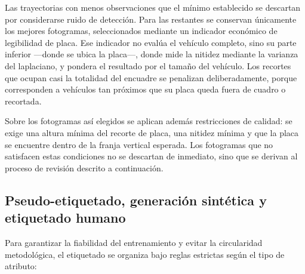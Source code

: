 Las trayectorias con menos observaciones que el mínimo establecido se descartan
por considerarse ruido de detección. Para las restantes se conservan únicamente
los mejores fotogramas, seleccionados mediante un indicador económico de
legibilidad de placa. Ese indicador no evalúa el vehículo completo, sino su parte
inferior ---donde se ubica la placa---, donde mide la nitidez mediante la varianza
del laplaciano, y pondera el resultado por el tamaño del vehículo. Los recortes
que ocupan casi la totalidad del encuadre se penalizan deliberadamente, porque
corresponden a vehículos tan próximos que su placa queda fuera de cuadro o
recortada.

Sobre los fotogramas así elegidos se aplican además restricciones de calidad: se
exige una altura mínima del recorte de placa, una nitidez mínima y que la placa se
encuentre dentro de la franja vertical esperada. Los fotogramas que no satisfacen
estas condiciones no se descartan de inmediato, sino que se derivan al proceso de
revisión descrito a continuación.

\subsection{Pseudo-etiquetado, generación sintética y etiquetado humano}

Para garantizar la fiabilidad del entrenamiento y evitar la circularidad
metodológica, el etiquetado se organiza bajo reglas estrictas según el tipo de
atributo:

